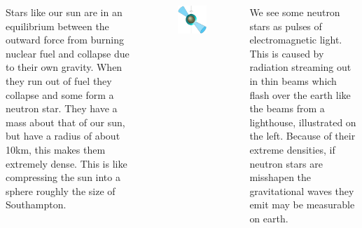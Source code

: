 \documentclass[20pt, a1paper, portrait, margin=0mm, innermargin=10mm,
               blockverticalspace=10mm,colspace=5mm, subcolspace=0mm]
               {tikzposter}
\begin{document}
\begin{columns}
{Stars like our sun are in an equilibrium between the outward force from burning
nuclear fuel and collapse due to their own gravity.  When they
run out of fuel they collapse and some form a neutron star.
They have a mass about that of our sun, but have a radius of about 10km, this
makes them extremely dense. This is like compressing the sun into a sphere
roughly the size of Southampton.
\vspace{4mm}
\begin{figure}
    \vspace{-15mm}
\begin{tikzfigure}
\centering
\includegraphics[width=\linewidth]{img/star-crop}
\end{tikzfigure}
\end{figure}

We see some neutron stars as pulses of electromagnetic light. This is caused by
radiation streaming out in thin beams which flash over the earth like the beams
from a lighthouse, illustrated on the left.  Because of their extreme
densities, if neutron stars are misshapen the gravitational waves they emit may be
measurable on earth.

\vspace{4.0mm}
}

\end{columns}
\end{document}
